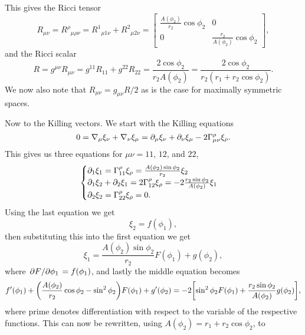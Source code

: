\documentclass[11pt,a4paper, 
swedish, english %
]{article}
\begin{document}
This gives the Ricci tensor
\begin{equation}
R_{\mu\nu}={R^\rho}_{\mu\rho\nu}={R^1}_{\mu1\nu}+{R^2}_{\mu2\nu}
=\begin{bmatrix}
\frac{A(\phi_2)}{r_2}\cos\phi_2&0\\
0&\frac{r_2}{A(\phi_2)}\cos\phi_2
\end{bmatrix},
\end{equation}
and the Ricci scalar
\begin{equation}
R=g^{\mu\nu}R_{\mu\nu}=g^{11}R_{11}+g^{22}R_{22}
=\frac{2\cos\phi_2}{r_2A(\phi_2)}
=\frac{2\cos\phi_2}{r_2(r_1+r_2\cos\phi_2)}.
\end{equation}
We now also note that $R_{\mu\nu}=g_{\mu\nu}R/2$ as is the case for
maximally symmetric spaces.

Now to the Killing vectors. We start with the Killing equations
\begin{equation}
0=\nabla_\mu\xi_\nu+\nabla_\nu\xi_{\mu}
=\partial_\mu\xi_\nu+\partial_\nu\xi_{\mu}-2\Gamma^\rho_{\mu\nu}\xi_\rho.
\end{equation}
This gives us three equations for $\mu\nu=11$, $12$, and $22$,
\begin{equation}\label{eq11:Killing0}
\begin{cases}
\partial_1\xi_1=\Gamma^\rho_{11}\xi_{\rho}
=\frac{A(\phi_2)\sin\phi_2}{r_2}\xi_{2}\\
\partial_1\xi_2+\partial_2\xi_1=2\Gamma^\rho_{12}\xi_{\rho}
=-2\frac{r_2\sin\phi_2}{A(\phi_2)}\xi_1\\
\partial_2\xi_2=\Gamma^\rho_{22}\xi_{\rho}=0.
\end{cases}
\end{equation}
Using the last equation we get
\begin{equation}
\xi_2=f(\phi_1),
\end{equation}
then substituting this into the first equation we get
\begin{equation}\label{eq11:xi1}
\xi_1=\frac{A(\phi_2)\sin\phi_2}{r_2}F(\phi_1)+g(\phi_2),
\end{equation}
where $\pdv*{F}{\phi_1}=f(\phi_1)$, and lastly the middle equation
becomes 
\begin{equation}
f'(\phi_1)+\qty(\frac{A(\phi_2)}{r_2}\cos\phi_2-\sin^2\phi_2)F(\phi_1)
+g'(\phi_2)=-2
\qty[\sin^2\phi_2F(\phi_1)+\frac{r_2\sin\phi_2}{A(\phi_2)}g(\phi_2)],
\end{equation}
where prime denotes differentiation with respect to the variable of the
respective functions. This can now be rewritten, using
$A(\phi_2)=r_1+r_2\cos\phi_2$, to 
\end{document}

